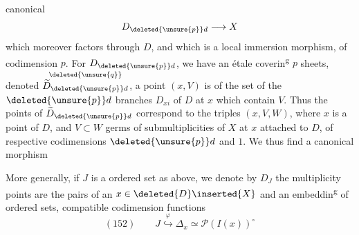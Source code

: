 canonical
\[
D_{\deleted{\unsure{p}}d}\longrightarrow X
\]
which moreover factors through $D$, and which is a local immersion morphism, of codimension $p$. For $D_{\deleted{\unsure{p}}d}$, we have an étale coverin\textsuperscript{g}  $p$ sheets, denoted $\overset{\deleted{\unsure{q}}}{\widetilde D_{\deleted{\unsure{p}}d}}$,  a point $(x,V)$ is  of the set of the $\deleted{\unsure{p}}d$ branches $D_{xi}$ of $D$ at $x$ which contain $V$. Thus the  points of $\widetilde D_{\deleted{\unsure{p}}d}$ correspond to the triples $(x,V,W)$, where $x$ is a point of $D$, and $V\subset W$ germs of submultiplicities of $X$ at $x$ attached to $D$, of respective codimensions $\deleted{\unsure{p}}d$ and $1$. We thus find a canonical morphism

More generally, if $J$ is a  ordered set as above,  we  denote by $D_J$ the  multiplicity  points are the pairs of an $x\in\deleted{D}\inserted{X}$  and an embeddin\textsuperscript{g} of ordered sets, compatible  codimension functions
\[
(152)\qquad J\mathrel{\overset{\varphi}{\hookrightarrow}}\Delta_x\simeq\mathcal P(I(x))^\circ
\]
